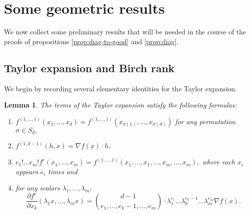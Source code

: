 \documentclass[12pt]{amsart}
\newtheorem{lemma}[theorem]{Lemma}
\theoremstyle{definition}
\begin{document}
\section{Some geometric results}

We now collect some preliminary results that will be needed in the course of the proofs of propositions \ref{prop:diag-to-good} and \ref{prop:diag}.

\subsection{Taylor expansion and Birch rank} We begin by recording several elementary identities for the Taylor expansion.

\begin{lemma}\label{lem:Taylor-identities} 
    The terms of the Taylor expansion satisfy the following formulas:
    \begin{enumerate}
        \item $f^{(1,\ldots,1)}(x_1,\ldots,x_d) = f^{(1,\ldots,1)}(x_{\sigma(1)},\ldots,x_{\sigma(d)})$ for any permutation $\sigma\in S_d,$ 
        \item $f^{(1,d-1)}(h,x) = \nabla f(x) \cdot h,$
        \item $e_1!\ldots e_m!f^e(x_1,\ldots,x_m) = f^{(1,\ldots,1)} (x_1,\ldots,x_1,\ldots,x_m,\ldots,x_m),$ where each $x_i$ appears $e_i$ times and
        \item   for any scalars $\lambda_1,\ldots,\lambda_m,$   
        \[
            \frac{\partial f^e }{\partial x_k}(\lambda_1 x,\ldots, \lambda_m x) = \binom{d-1}{e_1,\ldots,e_k-1,\ldots,e_m} \cdot \lambda_1^{e_1}\ldots\lambda_k^{e_k-1}\ldots\lambda_m^{e_m} \nabla f(x).
        \]
        
    \end{enumerate}
\end{lemma}
\end{document}
